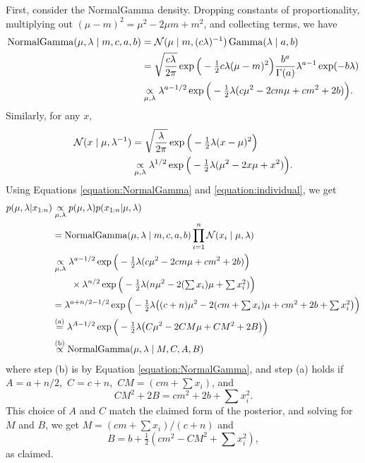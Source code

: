 \documentclass[12pt]{article}
\begin{document}
First, consider the NormalGamma density. Dropping constants of proportionality, multiplying out $(\mu-m)^2 =\mu^2 - 2\mu m + m^2$, and collecting terms, we have
\begin{align}
\operatorname*{NormalGamma}(\mu,\lambda\mid m,c,a,b) &= \mathcal{N}(\mu\mid m,(c\lambda)^{-1})\operatorname*{Gamma}(\lambda\mid a,b)\notag\\
&= \sqrt{\frac{c\lambda}{2\pi}}\exp\Big(-\tfrac{1}{2} c\lambda(\mu-m)^2\Big)
\frac{b^a}{\Gamma(a)}\lambda^{a-1}\exp(-b\lambda)\notag\\
&\underset{\mu,\lambda}{\propto} 
\lambda^{a-1/2}\exp\Big(-\tfrac{1}{2}\lambda(c\mu^2 - 2 c m\mu + c m^2 + 2 b)\Big).\label{equation:NormalGamma}
\end{align}
Similarly, for any $x$,
\begin{align}
\mathcal{N}(x\mid\mu,\lambda^{-1}) & =\sqrt{\frac{\lambda}{2\pi}}\exp\Big(-\tfrac{1}{2}\lambda(x-\mu)^2\Big)\notag\\
&\underset{\mu,\lambda}{\propto} \lambda^{1/2}\exp\Big(-\tfrac{1}{2}\lambda(\mu^2 - 2 x \mu + x^2)\Big).
\label{equation:individual}
\end{align}
Using Equations \ref{equation:NormalGamma} and \ref{equation:individual}, we get
\begin{align*}
p(\mu,\lambda|x_{1:n}) &\underset{\mu,\lambda}{\propto} p(\mu,\lambda) p(x_{1:n}|\mu,\lambda) \\
& = \operatorname*{NormalGamma}(\mu,\lambda\mid m,c,a,b) \prod_{i = 1}^n \mathcal{N}(x_i\mid\mu,\lambda)\\
&\underset{\mu,\lambda}{\propto}
\lambda^{a-1/2} \exp\Big(-\tfrac{1}{2}\lambda(c\mu^2 - 2 c m\mu + c m^2 + 2 b)\Big)\\
  & \qquad\times \lambda^{n/2} \exp\Big(-\tfrac{1}{2}\lambda(n\mu^2 - 2 (\textstyle\sum x_i) \mu + \sum x_i^2)\Big)\\
& = \lambda^{a+n/2-1/2}
\exp\Big(-\tfrac{1}{2}\lambda\big((c+n)\mu^2 - 2 (c m +\textstyle\sum x_i) \mu + c m^2 + 2 b + \sum x_i^2\big)\Big)\\
&\overset{\text{(a)}}{=}\lambda^{A-1/2}\exp\Big(-\tfrac{1}{2}\lambda\big(C\mu^2 - 2 C M \mu + C M^2 + 2 B\big)\Big)\\
&\overset{\text{(b)}}{\propto} \operatorname*{NormalGamma}(\mu,\lambda\mid M,C,A,B)
\end{align*}
where step (b) is by Equation \ref{equation:NormalGamma},
and step (a) holds if $A=a+n/2$, $\,C=c+n$, $\,C M = (c m + \textstyle\sum x_i)$, and
$$C M^2 + 2 B = c m^2 + 2 b + \sum x_i^2. $$
This choice of $A$ and $C$ match the claimed form of the posterior, and 
solving for $M$ and $B$, we get $M = (c m + \sum x_i)/(c+n)$ and 
$$ B = b +\tfrac{1}{2}(c m^2-C M^2+\textstyle\sum x_i^2), $$
as claimed.
\end{document}

